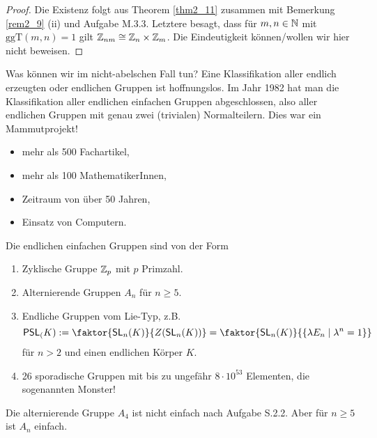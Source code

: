 \begin{proof}
	Die Existenz folgt aus Theorem \ref{thm2_11} zusammen mit Bemerkung \ref{rem2_9} (ii) und Aufgabe M.3.3. Letztere besagt, dass für $m, n \in \mathbb{N}$ mit $\mathrm{ggT}(m,n) = 1$ gilt $\mathbb{Z}_{nm} \cong \mathbb{Z}_n \times \mathbb{Z}_m$. Die Eindeutigkeit können/wollen wir hier nicht beweisen.
\end{proof}
Was können wir im nicht-abelschen Fall tun? Eine Klassifikation aller endlich erzeugten oder endlichen Gruppen ist hoffnungslos. Im Jahr 1982 hat man die Klassifikation aller endlichen einfachen Gruppen abgeschlossen, also aller endlichen Gruppen mit genau zwei (trivialen) Normalteilern. Dies war ein Mammutprojekt!
\begin{itemize}
	\item mehr als 500 Fachartikel,
	\item mehr als 100 MathematikerInnen,
	\item Zeitraum von über 50 Jahren,
	\item Einsatz von Computern.
\end{itemize}
Die endlichen einfachen Gruppen sind von der Form
\begin{enumerate}[label=(\arabic*)]
	\item Zyklische Gruppe $\mathbb{Z}_p$ mit $p$ Primzahl.
	\item Alternierende Gruppen $A_n$ für $n \geq 5$.
	\item Endliche Gruppen vom Lie-Typ, z.B.
	\[\mathsf{PSL}_(K) := \faktor{\SL_n(K)}{Z(\SL_n(K))} = \faktor{\SL_n(K)}{\{\lambda E_n \mid \lambda^n = 1\}}\]
	für $n > 2$ und einen endlichen Körper $K$.
	\item 26 sporadische Gruppen mit bis zu ungefähr $8 \cdot 10^{53}$ Elementen, die sogenannten Monster!
\end{enumerate}
\begin{beispiel}\label{beispiel2_13}
	Die alternierende Gruppe $A_4$ ist nicht einfach nach Aufgabe S.2.2. Aber für $n \geq 5$ ist $A_n$ einfach.
\end{beispiel}

